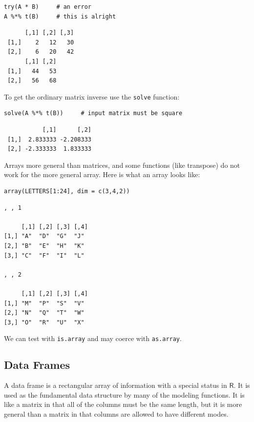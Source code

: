 \documentclass[captions=tableheading]{scrbook}
\begin{document}
\begin{example}
\lstset{language=R}
\begin{lstlisting}
try(A * B)     # an error
A %*% t(B)     # this is alright
\end{lstlisting}

\begin{verbatim}
      [,1] [,2] [,3]
 [1,]    2   12   30
 [2,]    6   20   42
      [,1] [,2]
 [1,]   44   53
 [2,]   56   68
\end{verbatim}

To get the ordinary matrix inverse use the \texttt{solve} function: 


\lstset{language=R}
\begin{lstlisting}
solve(A %*% t(B))     # input matrix must be square
\end{lstlisting}

\begin{verbatim}
           [,1]      [,2]
 [1,]  2.833333 -2.208333
 [2,] -2.333333  1.833333
\end{verbatim}

Arrays more general than matrices, and some functions (like transpose) do not work for the more general array. Here is what an array looks like: 


\lstset{language=R}
\begin{lstlisting}
array(LETTERS[1:24], dim = c(3,4,2))
\end{lstlisting}


\begin{verbatim}
, , 1

     [,1] [,2] [,3] [,4]
[1,] "A"  "D"  "G"  "J" 
[2,] "B"  "E"  "H"  "K" 
[3,] "C"  "F"  "I"  "L" 

, , 2

     [,1] [,2] [,3] [,4]
[1,] "M"  "P"  "S"  "V" 
[2,] "N"  "Q"  "T"  "W" 
[3,] "O"  "R"  "U"  "X"
\end{verbatim}

We can test with \texttt{is.array} and may coerce with \texttt{as.array}.
\subsection{Data Frames}
\label{sec-20-1-3}


A data frame is a rectangular array of information with a special status in \(\mathsf{R}\). It is used as the fundamental data structure by many of the modeling functions. It is like a matrix in that all of the columns must be the same length, but it is more general than a matrix in that columns are allowed to have different modes.



\end{example}
\end{document}
